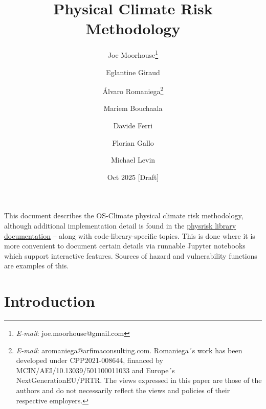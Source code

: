 \documentclass[a4paper,11pt]{extarticle} %
\title{Physical Climate Risk Methodology}
\author{Joe Moorhouse\thanks{\textit{E-mail}: joe.moorhouse@gmail.com}
        \and
        Eglantine Giraud
        \and
        Álvaro Romaniega\thanks{\textit{E-mail}: aromaniega@arfimaconsulting.com. Romaniega´s work has been developed under CPP2021-008644, financed by MCIN/AEI/10.13039/501100011033 and Europe´s NextGenerationEU/PRTR.
        \smallskip
        \newline%
    The views expressed in this paper are those of the authors and do not necessarily reflect the views and policies of their respective employers.}
        \and
        Mariem Bouchaala
        \and
        Davide Ferri
        \and
        Florian Gallo
        \and
        Michael Levin
    }
\date{Oct 2025 [Draft]}
\theoremstyle{definition}
\begin{document}

\maketitle{}



\clearpage
\setcounter{tocdepth}{4}
\renewcommand{\contentsname}{Contents}
\tableofcontents




\clearpage

\begin{framed}
This document describes the OS-Climate physical climate risk methodology, although additional implementation detail is found in the \href{https://physrisk.readthedocs.io/en/latest/}{physrisk library documentation} -- along with code-library-specific topics. This is done where it is more convenient to document certain details via runnable Jupyter notebooks which support interactive features. Sources of hazard and vulnerability functions are examples of this.
\end{framed}

\section{Introduction}
\label{Sec:Introduction}
\end{document}
